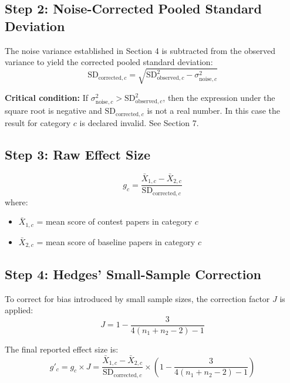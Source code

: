 \documentclass[11pt]{article}
\begin{document}
\subsection{Step 2: Noise-Corrected Pooled Standard Deviation}

The noise variance established in Section 4 is subtracted from the observed variance to yield the corrected pooled standard deviation:
\begin{equation}
\text{SD}_{\text{corrected},c} = \sqrt{\text{SD}^2_{\text{observed},c} - \sigma^2_{\text{noise},c}}
\end{equation}

\textbf{Critical condition:} If $\sigma^2_{\text{noise},c} > \text{SD}^2_{\text{observed},c}$, then the expression under the square root is negative and $\text{SD}_{\text{corrected},c}$ is not a real number. In this case the result for category $c$ is declared invalid. See Section 7.

\subsection{Step 3: Raw Effect Size}

\begin{equation}
g_c = \frac{\bar{X}_{1,c} - \bar{X}_{2,c}}{\text{SD}_{\text{corrected},c}}
\end{equation}
where:
\begin{itemize}
    \item $\bar{X}_{1,c}$ = mean score of contest papers in category $c$
    \item $\bar{X}_{2,c}$ = mean score of baseline papers in category $c$
\end{itemize}

\subsection{Step 4: Hedges' Small-Sample Correction}

To correct for bias introduced by small sample sizes, the correction factor $J$ is applied:
\begin{equation}
J = 1 - \frac{3}{4(n_1 + n_2 - 2) - 1}
\end{equation}

The final reported effect size is:
\begin{equation}
g'_c = g_c \times J = \frac{\bar{X}_{1,c} - \bar{X}_{2,c}}{\text{SD}_{\text{corrected},c}} \times \left(1 - \frac{3}{4(n_1 + n_2 - 2) - 1}\right)
\end{equation}
\end{document}
